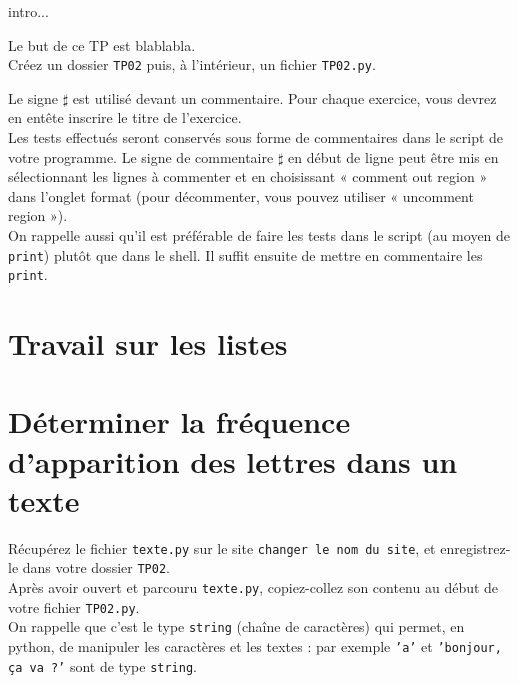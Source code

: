 \documentclass[t,10pt]{article}
\newcommand{\site}{\texttt{changer le nom du site}}
\begin{document}
\entetetpinfo

intro...

\bigskip

Le but de ce TP est blablabla.\\

Créez un dossier \texttt{TP02} puis, à l'intérieur, un fichier \texttt{TP02.py}. 


\begin{activite}
Le signe $\sharp$ est utilisé devant un commentaire. Pour chaque exercice, vous devrez en entête inscrire le titre de l'exercice.\\
Les tests effectués seront conservés sous forme de commentaires dans le script de votre programme. Le signe de commentaire $\sharp$ en début de ligne peut être mis en sélectionnant les lignes à commenter et en choisissant « comment out region » dans l'onglet format (pour décommenter, vous pouvez utiliser « uncomment region »).\\
On rappelle aussi qu'il est préférable de faire les tests dans le script (au moyen de \texttt{print}) plutôt que dans le shell. Il suffit ensuite de mettre en commentaire les \texttt{print}. 
\vspace{0.2cm}
\end{activite}

\section{Travail sur les listes}

\section{Déterminer la fréquence d'apparition des lettres dans un texte}

Récupérez  le fichier \texttt{texte.py} sur le site \site, et enregistrez-le dans votre dossier \texttt{TP02}.\\
Après avoir ouvert et parcouru \texttt{texte.py}, copiez-collez son contenu au début de votre fichier \texttt{TP02.py}.\\

On rappelle que c'est le type \texttt{string} (chaîne de caractères) qui permet, en python, de manipuler les caractères et les textes : par exemple \texttt{'a'} et \texttt{'bonjour, ça va ?'} sont de type \texttt{string}.

\bigskip
\end{document}

